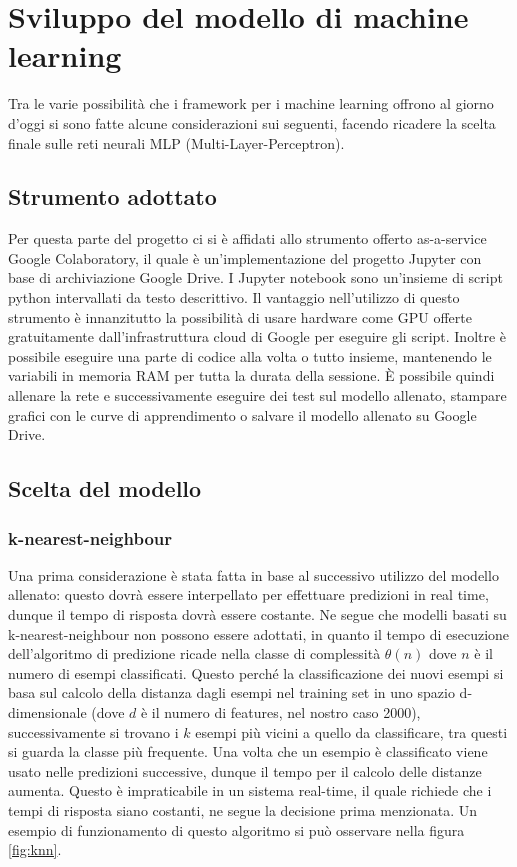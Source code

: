 \section{Sviluppo del modello di machine learning}
Tra le varie possibilità che i framework per i machine learning offrono al giorno d'oggi si sono fatte alcune considerazioni sui seguenti, facendo ricadere la scelta finale sulle reti neurali MLP (Multi-Layer-Perceptron).

\subsection{Strumento adottato}
Per questa parte del progetto ci si è affidati allo strumento offerto as-a-service Google Colaboratory, il quale è un'implementazione del progetto Jupyter con base di archiviazione Google Drive.
I Jupyter notebook sono un'insieme di script python intervallati da testo descrittivo.
Il vantaggio nell'utilizzo di questo strumento è innanzitutto la possibilità di usare hardware come GPU offerte gratuitamente dall'infrastruttura cloud di Google per eseguire gli script. Inoltre è possibile eseguire una parte di codice alla volta o tutto insieme, mantenendo le variabili in memoria RAM per tutta la durata della sessione. È possibile quindi allenare la rete e successivamente eseguire dei test sul modello allenato, stampare grafici con le curve di apprendimento o salvare il modello allenato su Google Drive.

\subsection{Scelta del modello}
\subsubsection{k-nearest-neighbour}
Una prima considerazione è stata fatta in base al successivo utilizzo del modello allenato: questo dovrà essere interpellato per effettuare predizioni in real time, dunque il tempo di risposta dovrà essere costante. Ne segue che modelli basati su k-nearest-neighbour non possono essere adottati, in quanto il tempo di esecuzione dell'algoritmo di predizione ricade nella classe di complessità $\theta (n)$ dove $n$ è il numero di esempi classificati. Questo perché la classificazione dei nuovi esempi si basa sul calcolo della distanza dagli esempi nel training set in uno spazio d-dimensionale (dove $d$ è il numero di features, nel nostro caso 2000), successivamente si trovano i $k$ esempi più vicini a quello da classificare, tra questi si guarda la classe più frequente. Una volta che un esempio è classificato viene usato nelle predizioni successive, dunque il tempo per il calcolo delle distanze aumenta. Questo è impraticabile in un sistema real-time, il quale richiede che i tempi di risposta siano costanti, ne segue la decisione prima menzionata. Un esempio di funzionamento di questo algoritmo si può osservare nella figura \ref{fig:knn}.

